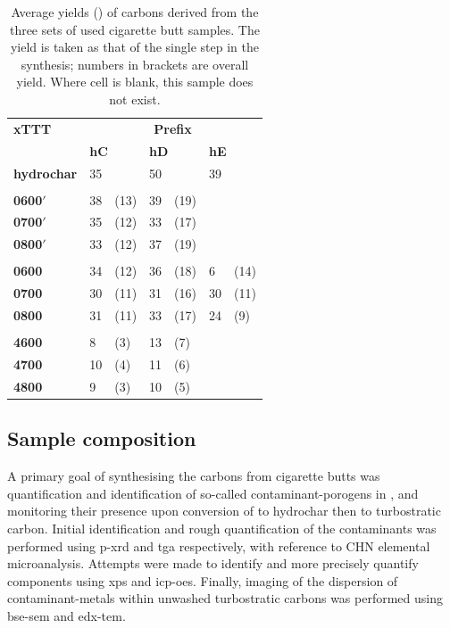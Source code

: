 \begin{table}[t!]
    \caption{Average yields (\unit{\wtpercent}) of carbons derived from the three sets of used cigarette butt samples. The yield is taken as that of the single step in the synthesis; numbers in brackets are overall yield. Where cell is blank, this sample does not exist.}
    \label{tb:cb_yield}
    \begin{tabularx}{\textwidth}{llXlXlX}
        \toprule
            \textbf{xTTT} & \multicolumn{6}{c}{\textbf{Prefix}} \\
            & \multicolumn{2}{l}{\textbf{hC}} & \multicolumn{2}{l}{\textbf{hD}} & \multicolumn{2}{l}{\textbf{hE}} \\ 
        \midrule
            \textbf{hydrochar}  & 35 & & 50 & & 39 & \\
        \\
            \textbf{0600$'$} & 38 & (13) & 39 & (19) & & \\
            \textbf{0700$'$} & 35 & (12) & 33 & (17) & & \\
            \textbf{0800$'$} & 33 & (12) & 37 & (19) & & \\
        \\
            \textbf{0600} & 34 & (12) & 36 & (18) & 6 & (14) \\
            \textbf{0700} & 30 & (11) & 31 & (16) & 30 & (11)\\
            \textbf{0800} & 31 & (11) & 33 & (17) & 24 & (9)\\
        \\
            \textbf{4600} & 8 & (3) & 13 & (7) & & \\
            \textbf{4700} & 10 & (4) & 11 & (6) & & \\
            \textbf{4800} & 9 & (3) & 10 & (5) & & \\
        \bottomrule
    \end{tabularx}%
\end{table}


\subsection{Sample composition}

A primary goal of synthesising the carbons from cigarette butts was quantification and identification of so-called contaminant-\glspl{porogen} in , and monitoring their presence upon conversion of  to \gls{hydrochar} then to \gls{turbostratic carbon}. Initial identification and rough quantification of the contaminants was performed using \acrshort{p-xrd} and \acrshort{tga} respectively, with reference to CHN elemental microanalysis. Attempts were made to identify and more precisely quantify components using \acrshort{xps} and \acrshort{icp-oes}. Finally, imaging of the dispersion of contaminant-metals within unwashed \glspl{turbostratic carbon} was performed using \acrshort{bse}-\acrshort{sem} and \acrshort{edx}-\acrshort{tem}.


